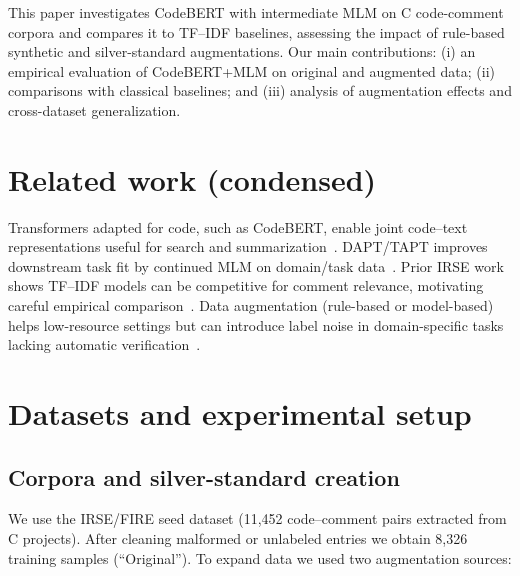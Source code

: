 \documentclass[runningheads]{ceurart}
\begin{document}
This paper investigates CodeBERT with intermediate MLM on C code-comment corpora and compares it to TF--IDF baselines, assessing the impact of rule-based synthetic and silver-standard augmentations. Our main contributions: (i) an empirical evaluation of CodeBERT+MLM on original and augmented data; (ii) comparisons with classical baselines; and (iii) analysis of augmentation effects and cross-dataset generalization.

\section{Related work (condensed)}
Transformers adapted for code, such as CodeBERT, enable joint code–text representations useful for search and summarization~\cite{feng2020codebert,liu2022exploiting}. DAPT/TAPT improves downstream task fit by continued MLM on domain/task data~\cite{gururangan2020dapt,kim2025subset}. Prior IRSE work shows TF--IDF models can be competitive for comment relevance, motivating careful empirical comparison~\cite{basu2023identification}. Data augmentation (rule-based or model-based) helps low-resource settings but can introduce label noise in domain-specific tasks lacking automatic verification~\cite{wang2023synthetic,feng2021augmentation}.

\section{Datasets and experimental setup}
\subsection{Corpora and silver-standard creation}
We use the IRSE/FIRE seed dataset (11,452 code–comment pairs extracted from C projects). After cleaning malformed or unlabeled entries we obtain 8,326 training samples (``Original''). To expand data we used two augmentation sources:
\end{document}
